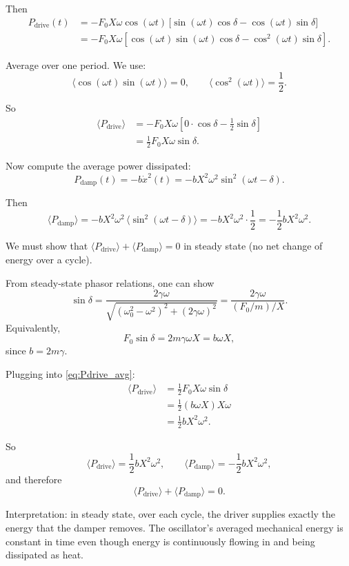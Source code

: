 \documentclass[../main.tex]{subfiles}
\begin{document}
\begin{enumerate}
Then
\begin{align}
P_\text{drive}(t)
&= -F_0 X \omega \cos(\omega t)\,
\big[ \sin(\omega t)\cos\delta - \cos(\omega t)\sin\delta \big] \\
&= -F_0 X \omega
\left[
\cos(\omega t)\sin(\omega t)\cos\delta
- \cos^2(\omega t)\sin\delta
\right].
\end{align}

Average over one period. We use:
\[
\langle \cos(\omega t)\sin(\omega t) \rangle = 0,
\qquad
\langle \cos^2(\omega t) \rangle = \frac{1}{2}.
\]

So
\begin{align}
\langle P_\text{drive} \rangle
&= -F_0 X \omega
\left[
0 \cdot \cos\delta
- \frac{1}{2}\sin\delta
\right] \\
&= \frac{1}{2} F_0 X \omega \sin\delta.
\label{eq:Pdrive_avg}
\end{align}

Now compute the average power dissipated:
\[
P_\text{damp}(t) = - b \dot{x}^2(t)
= - b X^2 \omega^2 \sin^2(\omega t - \delta).
\]

Then
\[
\langle P_\text{damp} \rangle
= - b X^2 \omega^2 \, \langle \sin^2(\omega t - \delta) \rangle
= - b X^2 \omega^2 \cdot \frac{1}{2}
= -\frac{1}{2} b X^2 \omega^2.
\label{eq:Pdamp_avg_prelim}
\]

We must show that $\langle P_\text{drive} \rangle + \langle P_\text{damp} \rangle = 0$ in steady state (no net change of energy over a cycle).

From steady-state phasor relations, one can show
\[
\sin\delta = \frac{2\gamma \omega}{\sqrt{(\omega_0^2 - \omega^2)^2 + (2 \gamma \omega)^2}}
= \frac{2\gamma \omega}{(F_0/m)/X}.
\]
Equivalently,
\[
F_0 \sin\delta
= 2 m \gamma \omega X
= b \omega X,
\]
since $b = 2 m \gamma$.

Plugging into \eqref{eq:Pdrive_avg}:
\begin{align}
\langle P_\text{drive} \rangle
&= \frac{1}{2} F_0 X \omega \sin\delta \\
&= \frac{1}{2} (b \omega X) X \omega \\
&= \frac{1}{2} b X^2 \omega^2.
\end{align}

So
\[
\boxed{
\langle P_\text{drive} \rangle
= \frac{1}{2} b X^2 \omega^2,
\qquad
\langle P_\text{damp} \rangle
= -\frac{1}{2} b X^2 \omega^2,
}
\]
and therefore
\[
\langle P_\text{drive} \rangle + \langle P_\text{damp} \rangle = 0.
\]

Interpretation: in steady state, over each cycle, the driver supplies exactly the energy that the damper removes. The oscillator's averaged mechanical energy is constant in time even though energy is continuously flowing in and being dissipated as heat.



\end{enumerate}
\end{document}

